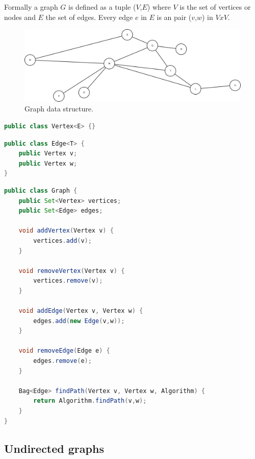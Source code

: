 Formally a graph $G$ is defined as a tuple ($V$,$E$) where $V$ is the set of vertices or nodes and $E$ the set of edges. Every edge $e$ in $E$ is an pair ($v$,$w$) in $V x V$.


\begin{figure}[H]
	\begin{center}
		\includegraphics[width=0.8\columnwidth]{img/programming-fundamentals/graph}
		\caption{Graph data structure.}
		\label{fig:graph}
	\end{center}
\end{figure}


\begin{lstlisting}[language=java, caption=Vertex in a graph., label=listing:graph:vertex]
public class Vertex<E> {}
\end{lstlisting}


\begin{lstlisting}[language=java, caption=Edge in a graph., label=listing:graph:edge]
public class Edge<T> {
	public Vertex v;
	public Vertex w;
}
\end{lstlisting}


\begin{lstlisting}[language=java, caption=Graph implementation skeleton., label=listing:graph:vertex]
public class Graph {
	public Set<Vertex> vertices;
	public Set<Edge> edges;
	
	void addVertex(Vertex v) {
		vertices.add(v);
	}
	
	void removeVertex(Vertex v) {
		vertices.remove(v);
	}
	
	void addEdge(Vertex v, Vertex w) {
		edges.add(new Edge(v,w));
	}
	
	void removeEdge(Edge e) {
		edges.remove(e);
	}
	
	Bag<Edge> findPath(Vertex v, Vertex w, Algorithm) {
		return Algorithm.findPath(v,w);
	}
}
\end{lstlisting}


\subsection{Undirected graphs}

